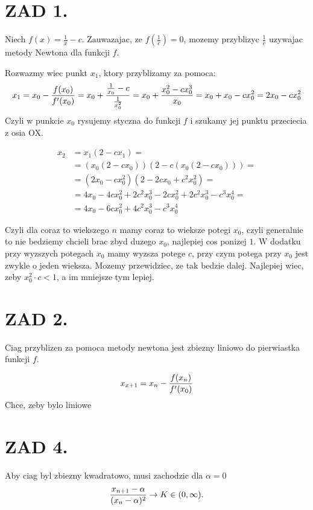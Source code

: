 \documentclass{article}[13pt]
\begin{document}
    \section*{ZAD 1.}
    
    Niech $f(x)=\frac 1x-c$. Zauwazajac, ze $f(\frac1c)=0$, mozemy przyblizyc $\frac1c$ uzywajac metody Newtona dla funkcji $f$.
    \medskip

    Rozwazmy wiec punkt $x_1$, ktory przyblizamy za pomoca:
    $$x_1=x_0-{f(x_0)\over f'(x_0)}=x_0+{\frac1{x_0}-c\over \frac1{x_0^2}}=x_0+{x^2_0-cx_0^3\over x_0}=x_0+x_0-cx_0^2=2x_0-cx_0^2$$
    Czyli w punkcie $x_0$ rysujemy styczna do funkcji $f$ i szukamy jej punktu przeciecia z osia OX.
    \bigskip

    \begin{align*}
        x_2&=x_1(2-cx_1)=\\
        &=(x_0(2-cx_0))(2-c(x_0(2-cx_0)))=\\
        &=(2x_0-cx_0^2)(2-2cx_0+c^2x_0^2)=\\
        &=4x_0-4cx_0^2+2c^2x_0^3-2cx_0^2+2c^2x_0^3-c^3x_0^4=\\
        &=4x_0-6cx_0^2+4c^2x_0^3-c^3x_0^4
    \end{align*}

    Czyli dla coraz to wiekszego $n$ mamy coraz to wieksze potegi $x_0$, czyli generalnie to nie bedziemy chcieli brac zbyd duzego $x_0$, najlepiej cos ponizej $1$. W dodatku przy wyzszych potegach $x_0$ mamy wyzsza potege $c$, przy czym potega przy $x_0$ jest zwykle o jeden wieksza. Mozemy przewidziec, ze tak bedzie dalej. Najlepiej wiec, zeby $x_0^2\cdot c<1$, a im mniejsze tym lepiej.


    \section*{ZAD 2.}

    Ciag przyblizen za pomoca metody newtona jest zbiezny liniowo do pierwiastka funkcji $f$.
    
    $$x_{x+1}=x_n-{f(x_n)\over f'(x_0)}$$
    Chce, zeby bylo liniowe

    \section*{ZAD 4.}

    Aby ciag byl zbiezny kwadratowo, musi zachodzic dla $\alpha=0$
    $${x_{n+1}-\alpha\over (x_n-\alpha)^2}\to K\in(0,\infty).$$

\end{document}
